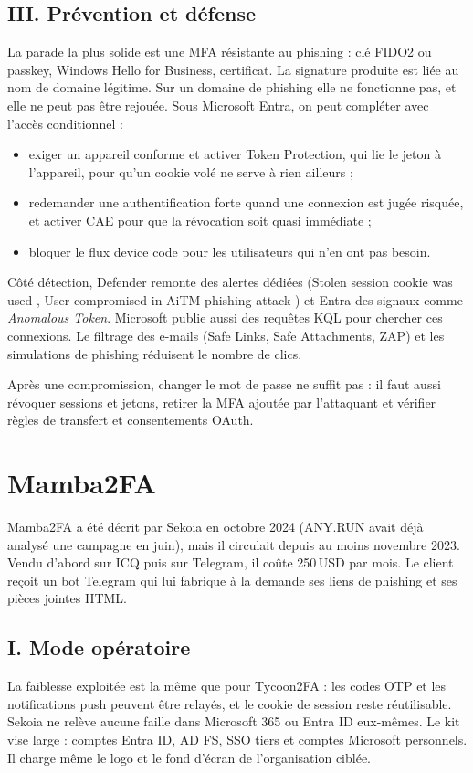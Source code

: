 \documentclass[10pt,a4paper]{article}
\begin{document}
\subsection{III. Prévention et défense}
La parade la plus solide est une MFA résistante au phishing : clé FIDO2 ou passkey, Windows Hello for Business, certificat. La signature produite est liée au nom de domaine légitime. Sur un domaine de phishing elle ne fonctionne pas, et elle ne peut pas être rejouée. Sous Microsoft Entra, on peut compléter avec l'accès conditionnel :
\begin{itemize}
  \item exiger un appareil conforme et activer Token Protection, qui lie le jeton à l'appareil, pour qu'un cookie volé ne serve à rien ailleurs ;
  \item redemander une authentification forte quand une connexion est jugée risquée, et activer CAE pour que la révocation soit quasi immédiate ;
  \item bloquer le flux device code pour les utilisateurs qui n'en ont pas besoin.
\end{itemize}
Côté détection, Defender remonte des alertes dédiées (\og Stolen session cookie was used \fg, \og User compromised in AiTM phishing attack \fg) et Entra des signaux comme \emph{Anomalous Token}. Microsoft publie aussi des requêtes KQL pour chercher ces connexions. Le filtrage des e-mails (Safe Links, Safe Attachments, ZAP) et les simulations de phishing réduisent le nombre de clics.

Après une compromission, changer le mot de passe ne suffit pas : il faut aussi révoquer sessions et jetons, retirer la MFA ajoutée par l'attaquant et vérifier règles de transfert et consentements OAuth.

\newpage
\section{Mamba2FA}
Mamba2FA a été décrit par Sekoia en octobre 2024 (ANY.RUN avait déjà analysé une campagne en juin), mais il circulait depuis au moins novembre 2023. Vendu d'abord sur ICQ puis sur Telegram, il coûte 250\,USD par mois. Le client reçoit un bot Telegram qui lui fabrique à la demande ses liens de phishing et ses pièces jointes HTML.

\subsection{I. Mode opératoire}
La faiblesse exploitée est la même que pour Tycoon2FA : les codes OTP et les notifications push peuvent être relayés, et le cookie de session reste réutilisable. Sekoia ne relève aucune faille dans Microsoft 365 ou Entra ID eux-mêmes. Le kit vise large : comptes Entra ID, AD FS, SSO tiers et comptes Microsoft personnels. Il charge même le logo et le fond d'écran de l'organisation ciblée.
\end{document}
